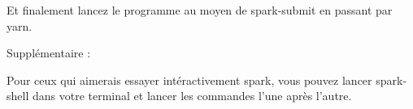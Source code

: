 \documentclass[11pt]{article}
\newcommand{\question}[1] %
{
\refstepcounter{questions} %
\par\noindent %
\phantomsection %
\addcontentsline{faq}{questions}{#1} %
\todo[inline, color=blue!40]{\textbf{#1}} %
\vspace{1em} %
}
\begin{document}


Et finalement lancez le programme au moyen de spark-submit en passant par yarn.




Supplémentaire : 

Pour ceux qui aimerais essayer intéractivement spark, vous pouvez lancer spark-shell dans votre terminal et lancer les commandes l'une après l'autre.




% 
% 
% 
% 
% 
% 
% 
% 
% 
% 
% 
% 
% 
% 
% 
% 
% 
% 
% 
% 
\end{document}
